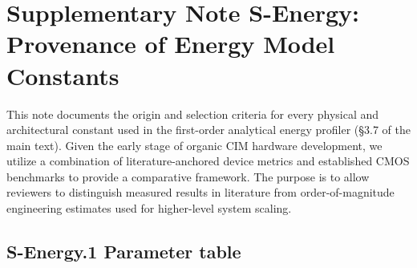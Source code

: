 
\section*{Supplementary Note S-Energy: Provenance of Energy Model Constants}
\label{supp:energy-provenance}

This note documents the origin and selection criteria for every physical and architectural constant used in the first-order analytical energy profiler (\S 3.7 of the main text). Given the early stage of organic CIM hardware development, we utilize a combination of literature-anchored device metrics and established CMOS benchmarks to provide a comparative framework. The purpose is to allow reviewers to distinguish measured results in literature from order-of-magnitude engineering estimates used for higher-level system scaling.

\subsection*{S-Energy.1 Parameter table}

